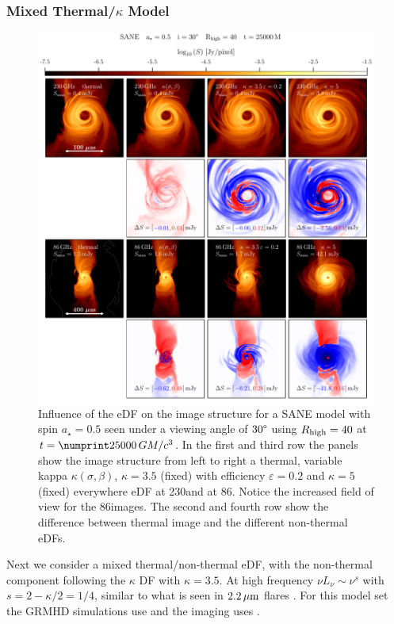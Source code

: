 \subsubsection{Mixed Thermal/\texorpdfstring{$\kappa$}{kappa} Model}

\begin{figure}
  \centering
  \includegraphics[width=\textwidth]{./figures/SANE_eDFs_diff_cbar.pdf}
  \caption{Influence of the eDF on the image structure for a SANE model with spin $a_{\star}=0.5$ seen under a viewing angle of $30\degree$ using $R_\mathrm{high} = 40$ at $t = \no{25000}\,\tg$.
    In the first and third row the panels show the image structure from left to right a thermal, variable kappa $\kappa(\sigma,\beta)$, $\kappa=3.5$ (fixed) with efficiency $\varepsilon=0.2$ and $\kappa=5$ (fixed) everywhere eDF at 230\GHz and at 86\GHz.
    Notice the increased field of view for the 86\GHz images.
    The second and fourth row show the difference between thermal image and the different non-thermal eDFs.}
  \label{fig:SANE_edfs}
\end{figure}

Next we consider a mixed thermal/non-thermal eDF, with the non-thermal component following the $\kappa$ DF with $\kappa = 3.5$.
At high frequency $\nu L_\nu \sim \nu^s$ with $s = 2 - \kappa/2 = 1/4$, similar to what is seen in $2.2\,\mu\mathrm{m}$ flares \citep{2007ApJ...667..900H}.
For this model set the GRMHD simulations use \bhac and the imaging uses \bhoss.

